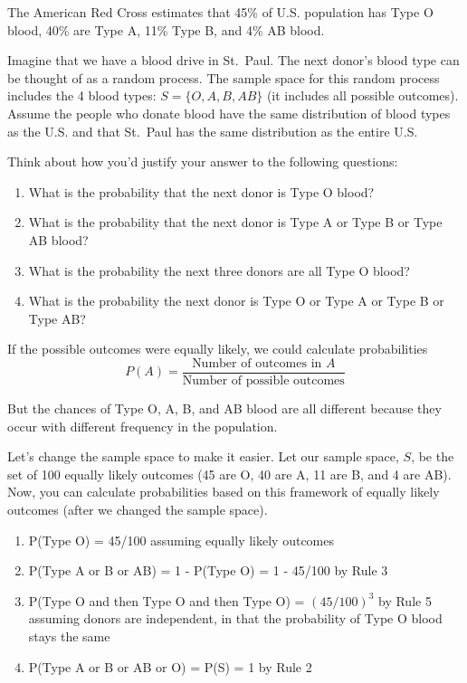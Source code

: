 \documentclass[
]{book}
\begin{document}
The American Red Cross estimates that 45\% of U.S. population has Type O blood, 40\% are Type A, 11\% Type B, and 4\% AB blood.

Imagine that we have a blood drive in St.~Paul. The next donor's blood type can be thought of as a random process. The sample space for this random process includes the 4 blood types: \(S= \{O,A,B,AB\}\) (it includes all possible outcomes). Assume the people who donate blood have the same distribution of blood types as the U.S. and that St.~Paul has the same distribution as the entire U.S.

Think about how you'd justify your answer to the following questions:

\begin{enumerate}
\def\labelenumi{\arabic{enumi}.}
\item
  What is the probability that the next donor is Type O blood?
\item
  What is the probability that the next donor is Type A or Type B or Type AB blood?
\item
  What is the probability the next three donors are all Type O blood?
\item
  What is the probability the next donor is Type O or Type A or Type B or Type AB?
\end{enumerate}

If the possible outcomes were equally likely, we could calculate probabilities
\[P(A) = \frac{\text{Number of outcomes in }A}{\text{Number of possible outcomes}}\]

But the chances of Type O, A, B, and AB blood are all different because they occur with different frequency in the population.

Let's change the sample space to make it easier. Let our sample space, \(S\), be the set of 100 equally likely outcomes (45 are O, 40 are A, 11 are B, and 4 are AB). Now, you can calculate probabilities based on this framework of equally likely outcomes (after we changed the sample space).

\begin{enumerate}
\def\labelenumi{\arabic{enumi}.}
\item
  P(Type O) = 45/100 assuming equally likely outcomes
\item
  P(Type A or B or AB) = 1 - P(Type O) = 1 - 45/100 by Rule 3
\item
  P(Type O and then Type O and then Type O) = \((45/100)^3\) by Rule 5 assuming donors are independent, in that the probability of Type O blood stays the same
\item
  P(Type A or B or AB or O) = P(S) = 1 by Rule 2
\end{enumerate}
\end{document}
